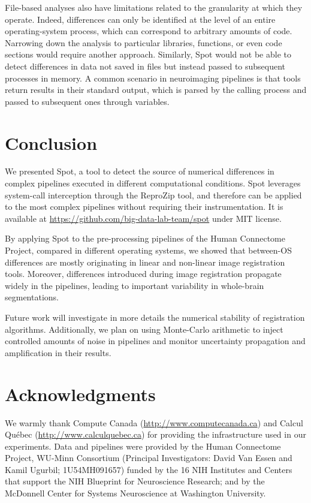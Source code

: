\documentclass[a4paper,num-refs]{oup-contemporary}
\newcommand{\reprozip}[0]{ReproZip\xspace}
\newcommand{\tristan}[1]{\color{orange}\textbf{From Tristan:}#1\color{black}}
\newcommand{\toolname}[0]{Spot\xspace}
\begin{document}
File-based analyses also have limitations related to the
granularity at which they operate. Indeed, differences can only be
identified at the level of an entire operating-system process, which can
correspond to arbitrary amounts of code. Narrowing down the analysis to
particular libraries, functions, or even code sections would require
another approach. Similarly, \toolname would not be able to detect
differences in data not saved in files but instead passed to subsequent processes
in memory. A common scenario in neuroimaging pipelines is that tools return
results in their standard output, which is parsed by the calling process
and passed to subsequent ones through variables. 

\section{Conclusion}

We presented \toolname, a tool to detect the source of numerical
differences in complex pipelines executed in different computational
conditions. \toolname leverages system-call interception through the
\reprozip tool, and therefore can be applied to the most complex pipelines
without requiring their instrumentation. It is available at
\url{https://github.com/big-data-lab-team/spot} under MIT license.

By applying \toolname to the pre-processing pipelines of the Human
Connectome Project, compared in different operating systems, we showed that
between-OS differences are mostly originating in linear and non-linear
image registration tools. Moreover, differences introduced during image
registration propagate widely in the pipelines, leading to important
variability in whole-brain segmentations.

Future work will investigate in more details the numerical stability of
registration algorithms. Additionally, we plan on using Monte-Carlo arithmetic
to inject controlled amounts of noise in pipelines and monitor
uncertainty propagation and amplification in their results.

\section{Acknowledgments}

We warmly thank Compute Canada (\url{http://www.computecanada.ca}) and Calcul
Qu\'ebec (\url{http://www.calculquebec.ca}) for providing the infrastructure used in our experiments.
Data and pipelines were provided by the Human Connectome Project, WU-Minn 
Consortium (Principal Investigators: David Van Essen and Kamil Ugurbil; 
1U54MH091657) funded by the 16 NIH Institutes and Centers that support 
the NIH Blueprint for Neuroscience Research; and by the McDonnell 
Center for Systems Neuroscience at Washington University.



\end{document}
